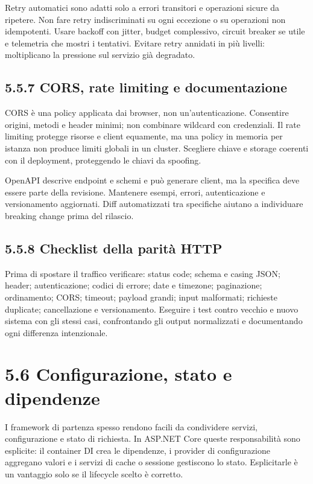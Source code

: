 \documentclass[
  italian,
  10pt,
]{book}
\begin{document}
Retry automatici sono adatti solo a errori transitori e operazioni
sicure da ripetere. Non fare retry indiscriminati su ogni eccezione o su
operazioni non idempotenti. Usare backoff con jitter, budget
complessivo, circuit breaker se utile e telemetria che mostri i
tentativi. Evitare retry annidati in più livelli: moltiplicano la
pressione sul servizio già degradato.

\subsection{5.5.7 CORS, rate limiting e
documentazione}\label{cors-rate-limiting-e-documentazione}

CORS è una policy applicata dai browser, non un'autenticazione.
Consentire origini, metodi e header minimi; non combinare wildcard con
credenziali. Il rate limiting protegge risorse e client equamente, ma
una policy in memoria per istanza non produce limiti globali in un
cluster. Scegliere chiave e storage coerenti con il deployment,
proteggendo le chiavi da spoofing.

OpenAPI descrive endpoint e schemi e può generare client, ma la
specifica deve essere parte della revisione. Mantenere esempi, errori,
autenticazione e versionamento aggiornati. Diff automatizzati tra
specifiche aiutano a individuare breaking change prima del rilascio.

\subsection{5.5.8 Checklist della parità
HTTP}\label{checklist-della-parituxe0-http}

Prima di spostare il traffico verificare: status code; schema e casing
JSON; header; autenticazione; codici di errore; date e timezone;
paginazione; ordinamento; CORS; timeout; payload grandi; input
malformati; richieste duplicate; cancellazione e versionamento. Eseguire
i test contro vecchio e nuovo sistema con gli stessi casi, confrontando
gli output normalizzati e documentando ogni differenza intenzionale.

\section{5.6 Configurazione, stato e
dipendenze}\label{configurazione-stato-e-dipendenze}

I framework di partenza spesso rendono facili da condividere servizi,
configurazione e stato di richiesta. In ASP.NET Core queste
responsabilità sono esplicite: il container DI crea le dipendenze, i
provider di configurazione aggregano valori e i servizi di cache o
sessione gestiscono lo stato. Esplicitarle è un vantaggio solo se il
lifecycle scelto è corretto.
\end{document}
